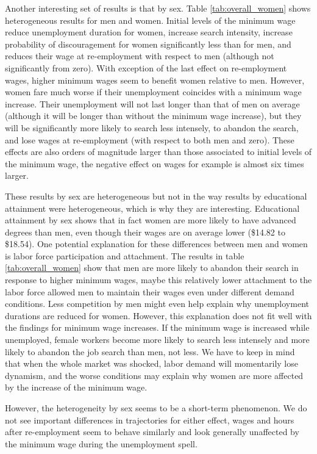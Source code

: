 \documentclass{article}
\begin{document}
Another interesting set of results is that by sex. Table \ref{tab:overall_women} shows heterogeneous results for men and women. Initial levels of the minimum wage reduce unemployment duration for women, increase search intensity, increase probability of discouragement for women significantly less than for men, and reduces their wage at re-employment with respect to men (although not significantly from zero). With exception of the last effect on re-employment wages, higher minimum wages seem to benefit women relative to men. However, women fare much worse if their unemployment coincides with a minimum wage increase. Their unemployment will not last longer than that of men on average (although it will be longer than without the minimum wage increase), but they will be significantly more likely to search less intensely, to abandon the search, and lose wages at re-employment (with respect to both men and zero). These effects are also orders of magnitude larger than those associated to initial levels of the minimum wage, the negative effect on wages for example is almost six times larger.

These results by sex are heterogeneous but not in the way results by educational attainment were heterogeneous, which is why they are interesting. Educational attainment by sex shows that in fact women are more likely to have advanced degrees than men, even though their wages are on average lower (\$14.82 to \$18.54). One potential explanation for these differences between men and women is labor force participation and attachment. The results in table \ref{tab:overall_women} show that men are more likely to abandon their search in response to higher minimum wages, maybe this relatively lower attachment to the labor force allowed men to maintain their wages even under different demand conditions. Less competition by men might even help explain why unemployment durations are reduced for women. However, this explanation does not fit well with the findings for minimum wage increases. If the minimum wage is increased while unemployed, female workers become more likely to search less intensely and more likely to abandon the job search than men, not less. We have to keep in mind that when the whole market was shocked, labor demand will momentarily lose dynamism, and the worse conditions may explain why women are more affected by the increase of the minimum wage.

However, the heterogeneity by sex seems to be a short-term phenomenon. We do not see important differences in trajectories for either effect, wages and hours after re-employment seem to behave similarly and look generally unaffected by the minimum wage during the unemployment spell.
\end{document}

